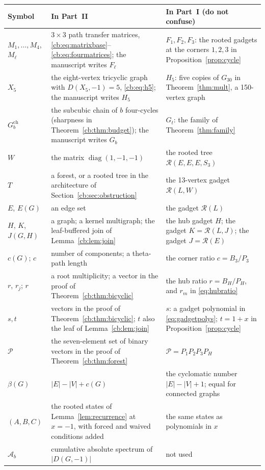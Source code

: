 \documentclass[11pt]{article}
\numberwithin{equation}{section}
\theoremstyle{definition}
\newcommand{\calP}{\mathcal P}
\newcommand{\diag}{\operatorname{diag}}
\newcommand{\Rtree}{\mathcal{R}}
\newcommand{\Gthirty}{G_{30}}
\begin{document}
{\small\renewcommand{\theHtable}{cb.conventions}%
\begin{longtable}{>{\raggedright\arraybackslash}p{.2\linewidth}>{\raggedright\arraybackslash}p{.37\linewidth}>{\raggedright\arraybackslash}p{.35\linewidth}}
\toprule
Symbol & In Part~II & In Part~I (do not confuse)\\\midrule
\endhead
\(M_1,\ldots,M_4\), \(M_\ell\) & \(3\times3\) path transfer matrices,
\eqref{cb:eq:matrixbase}--\eqref{cb:eq:fourmatrices}; the manuscript
writes \(F_\ell\) & \(F_1,F_2,F_3\): the rooted gadgets at the corners
\(1,2,3\) in Proposition~\ref{prop:cycle}\\
\(X_5\) & the eight-vertex tricyclic graph with \(D(X_5,-1)=5\),
\eqref{cb:eq:h5}; the manuscript writes \(H_5\) & \(H_5\): five copies of
\(\Gthirty\) in Theorem~\ref{thm:mult}, a 150-vertex graph\\
\(G^{\mathrm{ch}}_b\) & the subcubic chain of \(b\) four-cycles
(sharpness in Theorem~\ref{cb:thm:budget}); the manuscript writes
\(G_b\) & \(G_t\): the family of Theorem~\ref{thm:family}\\
\(W\) & the matrix \(\diag(1,-1,-1)\) & the rooted tree
\(\Rtree(E,E,E,S_3)\)\\
\(T\) & a forest, or a rooted tree in the architecture of
Section~\ref{cb:sec:obstruction} & the 13-vertex gadget \(\Rtree(L,W)\)\\
\(E\), \(E(G)\) & an edge set & the gadget \(\Rtree(L)\)\\
\(H\), \(K\), \(J(G,H)\) & a graph; a kernel multigraph; the
leaf-buffered join of Lemma~\ref{cb:lem:join} & the hub gadget \(H\); the
gadget \(K=\Rtree(L,J)\); the gadget \(J=\Rtree(E)\)\\
\(c(G)\); \(c\) & number of components; a theta-path length & the
corner ratio \(c=B_3/P_3\)\\
\(r\), \(r_j\); \(r\) & a root multiplicity; a vector in the proof of
Theorem~\ref{cb:thm:bicyclic} & the hub ratio \(r=B_H/P_H\), and
\(r_m\) in \eqref{eq:hubratio}\\
\(s,t\) & vectors in the proof of Theorem~\ref{cb:thm:bicyclic}; \(t\)
also the leaf of Lemma~\ref{cb:lem:join} & \(s\): a gadget polynomial in
\eqref{eq:gadgetpolys}; \(t=1+x\) in Proposition~\ref{prop:cycle}\\
\(\calP\) & the seven-element set of binary vectors in the proof of
Theorem~\ref{cb:thm:forest} & \(\mathcal P=P_1P_2P_3P_H\)\\
\(\beta(G)\) & \(|E|-|V|+c(G)\) & the cyclomatic number \(|E|-|V|+1\);
equal for connected graphs\\
\((A,B,C)\) & the rooted states of Lemma~\ref{lem:recurrence} at
\(x=-1\), with forced and waived conditions added & the same states as
polynomials in \(x\)\\
\(\mathcal A_b\) & cumulative absolute spectrum of \(|D(G,-1)|\) & not
used\\
\bottomrule
\end{longtable}}
\addtocounter{table}{-1}
\end{document}
